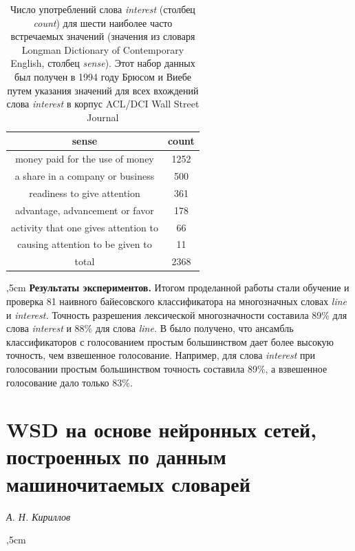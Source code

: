 \documentclass{article}
\begin{document}
\begin{articletext}
\begin{table}[H]
\centering
\caption{Число употреблений слова \textit{interest} (столбец \textit{count}) для шести наиболее часто встречаемых значений (значения из словаря Longman Dictionary of Contemporary English, столбец \textit{sense}). Этот набор данных был получен в 1994 году Брюсом и Виебе \cite{Bruce 1994} путем указания значений для всех вхождений слова \textit{interest} в корпус ACL/DCI Wall Street Journal}
\begin{tabular}{|c|c|}
\hline
sense & count\\
\hline
money paid for the use of money & 1252\\
a share in a company or business & 500\\
readiness to give attention & 361\\
advantage, advancement or favor & 178\\
activity that one gives attention to & 66\\
causing attention to be given to & 11\\
\hline
total & 2368\\
\hline
\end{tabular}
\label{tbl4}
\end{table}


,5cm
\textbf{Результаты экспериментов.} Итогом проделанной работы стали обучение и проверка 81 наивного байесовского классификатора на многозначных словах \textit{line} и \textit{interest.} Точность разрешения лексической многозначности составила 89\% для слова \textit{interest} и 88\% для слова \textit{line.} В \cite{Pedersen 2000} было получено, что ансамбль классификаторов с голосованием простым большинством дает более высокую точность, чем взвешенное голосование. Например, для слова \textit{interest} при голосовании простым большинством точность составила 89\%, а взвешенное голосование дало только 83\%.




\section{WSD на основе нейронных сетей, построенных по данным машиночитаемых словарей}

\begin{flushright}
\textit{А. Н. Кириллов}
\end{flushright}

,5cm


\end{articletext}
\end{document}
